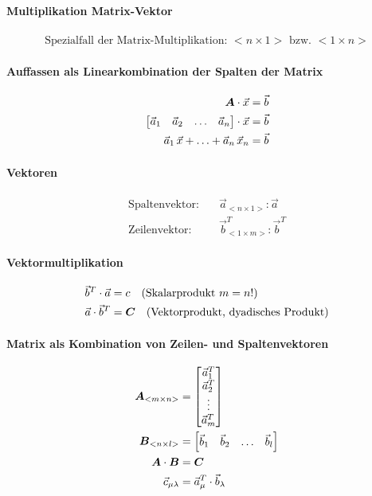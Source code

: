 \paragraph{Multiplikation Matrix-Vektor}
\begin{align}
	\text{Spezialfall der Matrix-Multiplikation: } <n\times 1> \text{ bzw. } <1\times n>
\end{align}

\paragraph{Auffassen als Linearkombination der Spalten der Matrix}
\begin{align}
	\boldsymbol {A} \cdot \vec{x} &= \vec{b}\\
	\begin{bmatrix}\vec{a}_1 & \vec{a}_2 & \ldots & \vec{a}_n\end{bmatrix} \cdot \vec{x} &= \vec{b}\\
	\vec{a}_1\,\vec{x} + \ldots + \vec{a}_n\,\vec{x}_n &= \vec{b}
\end{align}

\paragraph{Vektoren}
\begin{align}
	\text{Spaltenvektor:} \quad & \vec{a}_{<n\times 1>}: \vec{a}\\
	\text{Zeilenvektor:} \quad & \vec{b}_{<1\times m>}^T: \vec{b}^T
\end{align}

\paragraph{Vektormultiplikation}
\begin{align}
	\vec{b}^T\cdot \vec{a} &= c \quad \text{(Skalarprodukt $m=n$!)}\\
	\vec{a} \cdot \vec{b}^T &= \boldsymbol {C} \quad \text{(Vektorprodukt, dyadisches Produkt)}
\end{align}

\paragraph{Matrix als Kombination von Zeilen- und Spaltenvektoren}
\begin{align}
	\boldsymbol {A}_{<m\times n>} &= \begin{bmatrix} \vec{a}_1^T \\ \vec{a}_2^T \\ \vdots \\ \vec{a}_m^T \end{bmatrix}\\
	\boldsymbol {B}_{<n\times l>} &= \begin{bmatrix} \vec{b}_1 & \vec{b}_2 & \ldots & \vec{b}_l \end{bmatrix}\\
	\boldsymbol {A} \cdot \boldsymbol {B} &= \boldsymbol {C}\\
	\vec{c}_{\mu\lambda} &= \vec{a}_\mu^T \cdot \vec{b}_\lambda
\end{align}


